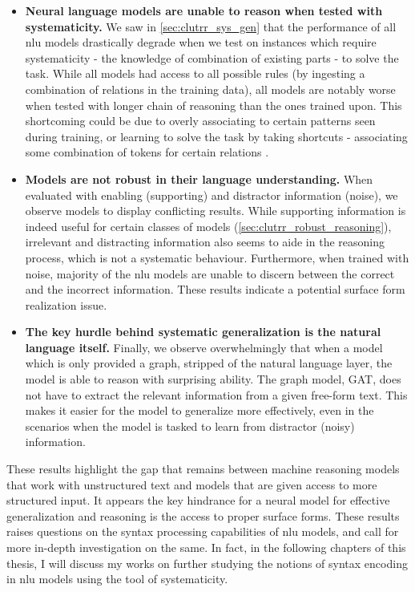 \documentclass[letterpaper, 12pt]{report}
\begin{document}
\begin{itemize}
  \item \textbf{Neural language models are unable to reason when tested with systematicity.} We saw in \autoref{sec:clutrr_sys_gen} that the performance of all \acrshort{nlu} models drastically degrade when we test on instances which require systematicity - the knowledge of combination of existing parts - to solve the task. While all models had access to all possible rules (by ingesting a combination of relations in the training data), all models are notably worse when tested with longer chain of reasoning than the ones trained upon. This shortcoming could be due to overly associating to certain patterns seen during training, or learning to solve the task by taking shortcuts - associating some combination of tokens for certain relations \citep{gururangan2018annotation}.
  \item \textbf{Models are not robust in their language understanding.} When evaluated with enabling (supporting) and distractor information (noise), we observe models to display conflicting results. While supporting information is indeed useful for certain classes of models (\autoref{sec:clutrr_robust_reasoning}), irrelevant and distracting information also seems to aide in the reasoning process, which is not a systematic behaviour. Furthermore, when trained with noise, majority of the \acrshort{nlu} models are unable to discern between the correct and the incorrect information. These results indicate a potential surface form realization issue.
  \item \textbf{The key hurdle behind systematic generalization is the natural language itself.} Finally, we observe overwhelmingly that when a model which is only provided a graph, stripped of the natural language layer, the model is able to reason with surprising ability. The graph model, GAT, does not have to extract the relevant information from a given free-form text. This makes it easier for the model to generalize more effectively, even in the scenarios when the model is tasked to learn from distractor (noisy) information.
\end{itemize}

These results highlight the gap that remains between machine reasoning models that work with unstructured text and models that are given access to more structured input. It appears the key hindrance for a neural model for effective generalization and reasoning is the access to proper surface forms. These results raises questions on the syntax processing capabilities of \acrshort{nlu} models, and call for more in-depth investigation on the same. In fact, in the following chapters of this thesis, I will discuss my works on further studying the notions of syntax encoding in \acrshort{nlu} models using the tool of systematicity.
\end{document}
